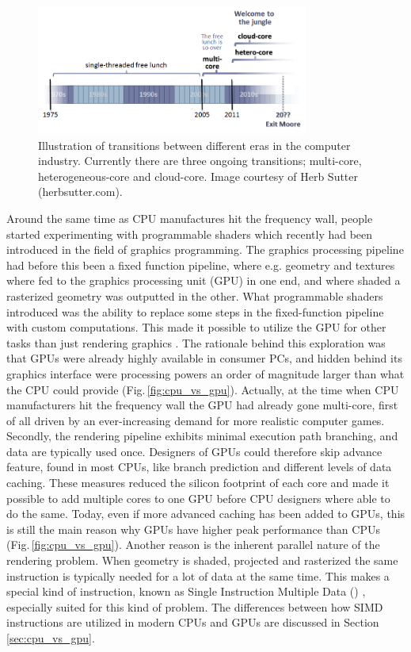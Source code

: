 \begin{figure}
\centering
\includegraphics[width=0.8\textwidth]{img/free_lunsh.png}
\caption{Illustration of transitions between different eras in the computer industry. Currently there are three ongoing transitions; multi-core, heterogeneous-core and cloud-core. Image courtesy of Herb Sutter (herbsutter.com).}
\label{fig:jungle}
\end{figure}

Around the same time as CPU manufactures hit the frequency wall, people started experimenting with programmable shaders which recently had been introduced in the field of graphics programming. The graphics processing pipeline had before this been a fixed function pipeline, where e.g. geometry and textures where fed to the graphics processing unit (GPU) in one end, and where shaded a rasterized geometry was outputted in the other. What programmable shaders  introduced was the ability to replace some steps in the fixed-function pipeline with custom computations. This made it possible to utilize the GPU for other tasks than just rendering graphics \cite{Seland2007}. The rationale behind this exploration was that GPUs were already highly available in consumer PCs, and hidden behind its graphics interface were processing powers an order of magnitude larger than what the CPU could provide (Fig.\,\ref{fig:cpu_vs_gpu}). Actually, at the time when CPU manufacturers hit the frequency wall the GPU had already gone multi-core, first of all driven by an ever-increasing demand for more realistic computer games. Secondly, the rendering pipeline exhibits minimal execution path branching, and data are typically used once. Designers of GPUs could therefore skip advance feature, found in most CPUs, like branch prediction and different levels of data caching. These measures reduced the silicon footprint of each core and made it possible to add multiple cores to one GPU before CPU designers where able to do the same. Today, even if more advanced caching has been added to GPUs, this is still the main reason why GPUs have higher peak performance than CPUs (Fig.\,\ref{fig:cpu_vs_gpu}). Another reason is the inherent parallel nature of the rendering problem. When geometry is shaded, projected and rasterized the same instruction is typically needed for a lot of data at the same time. This makes a special kind of instruction, known as Single Instruction Multiple Data () \cite{Flynn1966}, especially suited for this kind of problem. The differences between how SIMD instructions are utilized in modern CPUs and GPUs are discussed in Section \ref{sec:cpu_vs_gpu}.

